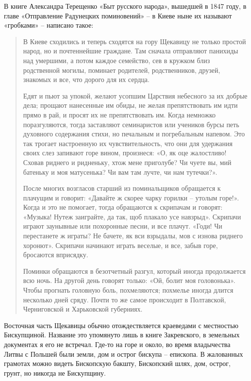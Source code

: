 
В книге Александра Терещенко «Быт русского народа», вышедшей в 1847 году, в главе «Отправление Радунецких поминовений» – в Киеве ныне их называют «гробками» – написано такое:

\begin{quotation}
В Киеве сходились и теперь сходятся на гору Щекавицу не только простой народ, но и почтеннейшие граждане. Там сначала отправляют панихиды над умершими, а потом каждое семейство, сев в кружком близ родственной могилы, поминает родителей, родственников, друзей, знакомых и все, что дорого для их сердца. 

Едят и пьют за упокой, желают усопшим Царствия небесного за их добрые дела; прощают нанесенные им обиды, не желая препятствовать им идти прямо в рай, и просят их не препятствовать им. Когда немножко поразгуляются, тогда заставляют семинаристов или учеников бурсы петь духовного содержания стихи, но печальным и погребальным напевом. Это так трогает настроенную их чувствительность, что они для удержания своих слез запивают горе вином, произнеся: «О, як оце жалостливо! Сховав риднего и ридненьку, хтож мене приголубе? Чи чуете вы, мий батеньку и моя матусенька? Чи вам там лучте, чи нам тутечки?».

После многих возгласов старший из поминальщиков обращается к плачущим и говорит: «Давайте ж скорее чарку горилки – утолым горе!». Когда и это не помогает, тогда обращаются к скрипачам и говорят: «Музыка! Нутеж заиграйте, да так, щоб плакало усе навзрыд». Скрипачи играют заунывные или похоронные песни, и все плачут. «Годи! Чи перестанете ж играты? Не бачете, як вси взрыдалы, мов с изнова риднего хоронют». Скрипачи начинают играть веселые, и все, забыв горе, бросаются вприсядку. 

Поминки обращаются в безотчетный разгул, который иногда продолжается всю ночь. На другой день говорят только: «Ой, болит моя головонька». Чтобы прогнать головную боль, похмеляются; похмелье иногда длится несколько дней сряду. Почти то же самое происходит в Полтавской, Черниговской и Харьковской губерниях.
\end{quotation}

Восточная часть Щекавицы обычно отождествляется краеведами с местностью Бискупщиной. Название это упомянуто лишь в книге Закревского, в земельных документах я его не встречал. Где-то на горе и около, во время владычества Литвы с Польшей были земли, дом и острог бискупа – епископа. В жалованных грамотах можно видеть Бископскую бакшту, Бископский шлях, дом, острог, грунт, но никогда не Бискупщину.


